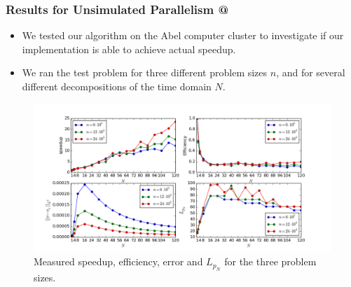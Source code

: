\documentclass[9pt]{beamer}
\makeatletter
\newcommand*{\rom}[1]{\expandafter\@slowromancap\romannumeral #1@}
\makeatother
\begin{document}
\begin{frame}
\frametitle{Results for Unsimulated Parallelism \rom{1}}
\begin{itemize}
\item{We tested our algorithm on the Abel computer cluster to investigate if our implementation is able to achieve actual speedup.}
\item{We ran the test problem for three different problem sizes $n$, and for several different decompositions of the time domain $N$.}
\end{itemize}
\begin{figure}[!h]
\centering
\includegraphics[scale=0.3]{fspeed_fig.png}
\caption{Measured speedup, efficiency, error and $L_{p_N}$ for the three problem sizes. }
\end{figure}
\end{frame}
\end{document}
